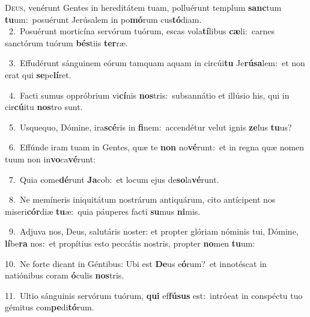 \lettrine{\initial\textcolor{\initialcolor}{D}}{eus,} venérunt Gentes in hereditátem tuam, polluérunt templum \textbf{sanc}\-tum \textbf{tu}\-um:~\star posuérunt Jerúsalem in po\-\textbf{mó}\-rum cus\-\textbf{tó}\-diam.\\
{\numbfont\textcolor{\numbcolor}{~2.}}~Posuérunt morticína servórum tuórum, escas vola\-\textbf{tí}\-libus \textbf{cæ}\-li:~\star carnes sanctórum tuórum \textbf{bés}\-tiis \textbf{ter}\-ræ.\par
{\numbfont\textcolor{\numbcolor}{~3.}}~Effudérunt sánguinem eórum tamquam aquam in circúi\textbf{tu} Je\-\textbf{rú}\-\textbf{sa}lem:~\star et non erat qui \textbf{se}\-pe\-\textbf{lí}\-ret.\par
{\numbfont\textcolor{\numbcolor}{~4.}}~Facti sumus oppróbrium vi\-\textbf{cí}\-nis \textbf{nos}\-tris:~\star subsannátio et illúsio his, qui in cir\-\textbf{cú}\-itu \textbf{nos}\-tro sunt.\par
{\numbfont\textcolor{\numbcolor}{~5.}}~Usquequo, Dómine, ira\-\textbf{scé}\-ris in \textbf{fi}\-nem:~\star accendétur velut ignis \textbf{ze}\-lus \textbf{tu}\-us?\par
{\numbfont\textcolor{\numbcolor}{~6.}}~Effúnde iram tuam in Gentes, quæ te \textbf{non} no\-\textbf{vé}\-runt:~\star et in regna quæ nomen tuum non in\-\textbf{vo}\-ca\-\textbf{vé}\-runt:\par
{\numbfont\textcolor{\numbcolor}{~7.}}~Quia come\-\textbf{dé}\-runt \textbf{Ja}\-cob:~\star et locum ejus de\-\textbf{so}\-la\-\textbf{vé}\-runt.\par
{\numbfont\textcolor{\numbcolor}{~8.}}~Ne memíneris iniquitátum nostrárum antiquárum, cito antícipent nos miseri\-\textbf{cór}\-diæ \textbf{tu}\-æ:~\star quia páuperes facti \textbf{su}\-mus \textbf{ni}\-mis.\par
{\numbfont\textcolor{\numbcolor}{~9.}}~Adjuva nos, Deus, salutáris noster: et propter glóriam nóminis tui, Dómine, \textbf{lí}\-be\textbf{ra} nos:~\star et propítius esto peccátis nostris, propter \textbf{no}\-men \textbf{tu}\-um:\par
{\numbfont\textcolor{\numbcolor}{10.}}~Ne forte dicant in Géntibus: Ubi est \textbf{De}\-us e\-\textbf{ó}\-rum?~\star et innotéscat in natiónibus coram \textbf{ó}\-culis \textbf{nos}\-tris.\par
{\numbfont\textcolor{\numbcolor}{11.}}~Ultio sánguinis servórum tuórum, \textbf{qui} ef\-\textbf{fú}\-\textbf{sus} est:~\star intróeat in conspéctu tuo gémitus com\-\textbf{pe}\-di\-\textbf{tó}\-rum.\par
